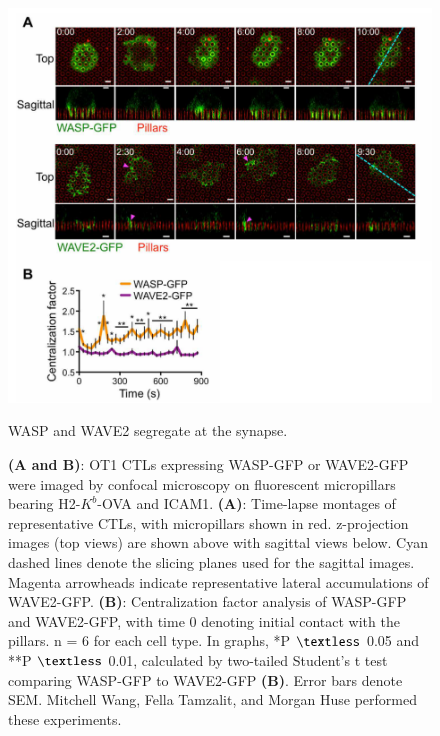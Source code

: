 \begin{figure}[htbp]
	\centering
	\includegraphics[width=\textwidth]{../figures/chapter2/fig5flprobes.png}
	\caption{WASP and WAVE2 segregate at the synapse.}
	\caption*{\textbf{(A and B)}: OT1 CTLs expressing WASP-GFP or WAVE2-GFP were imaged by confocal microscopy on fluorescent micropillars bearing H2-$K^{b}$-OVA and ICAM1. \textbf{(A)}: Time-lapse montages of representative CTLs, with micropillars shown in red. z-projection images (top views) are shown above with sagittal views below. Cyan dashed lines denote the slicing planes used for the sagittal images. Magenta arrowheads indicate representative lateral accumulations of WAVE2-GFP. \textbf{(B)}: Centralization factor analysis of WASP-GFP and WAVE2-GFP, with time 0 denoting initial contact with the pillars. n = 6 for each cell type. In graphs, *P $\textless$ 0.05 and **P $\textless$ 0.01, calculated by two-tailed Student’s t test comparing WASP-GFP to WAVE2-GFP \textbf{(B)}. Error bars denote SEM. Mitchell Wang, Fella Tamzalit, and Morgan Huse performed these experiments.}
	\label{fig:fig5flprobes}
\end{figure}

